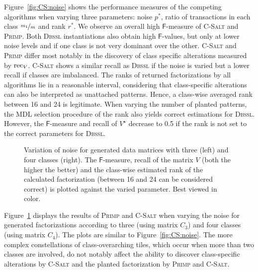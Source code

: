 Figure~\ref{fig:CS:noise} shows the performance measures of the competing algorithms when varying three parameters: noise $p^*$, ratio of transactions in each class $\nicefrac{m_1}{m}$ and rank $r^*$.
We observe an overall high $\mathsf{F}$-measure of \textsc{C-Salt} and \textsc{Primp}.
Both \textsc{Dbssl} instantiations also obtain high $\mathsf{F}$-values, but only at lower noise levels and if one class is not very dominant over the other.
\textsc{C-Salt} and \textsc{Primp} differ most notably in the discovery of class specific alterations measured by $\operatorname{rec}_V$. \textsc{C-Salt} shows a similar recall as \textsc{Dbssl} if the noise is varied but a lower recall if classes are imbalanced. The ranks of returned factorizations by all algorithms lie in a reasonable interval, considering that class-specific alterations can also be interpreted as unattached patterns. Hence, a class-wise averaged rank between 16 and 24 is legitimate. When varying the number of planted patterns, the MDL selection procedure of the rank also yields correct estimations for \textsc{Dbssl}. However, the $\mathsf{F}$-measure and recall of $V^\star$ decrease to 0.5 if the rank is not set to the correct parameters for \textsc{Dbssl}.

\begin{figure}[!t]
\centering

\caption{Variation of noise for generated data matrices with three (left) and four classes (right). The $\mathsf{F}$-measure, recall of the matrix $V$ (both the higher the better) and the class-wise estimated rank of the calculated factorization (between 16 and 24 can be considered correct) is plotted against the varied parameter. Best viewed in color.}
\label{fig:synthClass}
\end{figure}
Figure~\ref{fig:synthClass} displays the results of \textsc{Primp} and \textsc{C-Salt} when varying the noise for generated factorizations according to three (using matrix $C_3$) and four classes (using matrix $C_4$). The plots are similar to Figure~\ref{fig:CS:noise}. The more complex constellations of class-overarching tiles, which occur when more than two classes are involved, do not notably affect the ability to discover class-specific alterations by \textsc{C-Salt} and the planted factorization by \textsc{Primp} and \textsc{C-Salt}.

